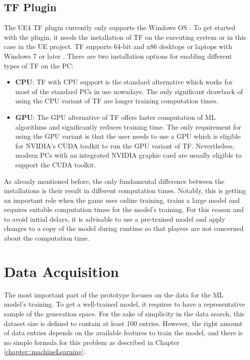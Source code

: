 \documentclass[MGS,Master,english]{twbook}%
\begin{document}
\subsection{\acl{TF} Plugin}
The UE4 \ac{TF} plugin currently only supports the Windows OS \cite{ue4::tensorFlowPlugin}. To get started with the plugin, it needs the installation of \ac{TF} on the executing system or in this case in the UE project. \ac{TF} supports 64-bit and x86 desktops or laptops with Windows 7 or later \cite{api::tensorFlow}. There are two installation options for enabling different types of \ac{TF} on the PC:
\begin{itemize}
	\item \textbf{\ac{CPU}}: \ac{TF} with CPU support is the standard alternative which works for most of the standard PCs in use nowadays. The only significant drawback of using the CPU variant of \ac{TF} are longer training computation times.
	\item \textbf{\ac{GPU}}: The GPU alternative of \ac{TF} offers faster computation of ML algorithms and significantly reduces training time. The only requirement for using the GPU variant is that the user needs to use a GPU which is eligible for NVIDIA's CUDA toolkit \cite{nvidia::cudaToolkit} to run the GPU variant of \ac{TF}. Nevertheless, modern PCs with an integrated NVIDIA graphic card are usually eligible to support the CUDA toolkit. 
\end{itemize}

As already mentioned before, the only fundamental difference between the installations is their result in different computation times. Notably, this is getting an important role when the game uses online training, trains a large model and requires suitable computation times for the model's training. For this reason and to avoid initial delays, it is advisable to use a pre-trained model and apply changes to a copy of the model during runtime so that players are not concerned about the computation time.

\section{Data Acquisition}
The most important part of the prototype focuses on the data for the ML model's training. To get a well-trained model, it requires to have a representative sample of the generation space. For the sake of simplicity in the data search, this dataset size is defined to contain at least 100 entries. However, the right amount of data entries depends on the available features to train the model, and there is no simple formula for this problem as described in Chapter \ref{chapter::machineLearning}. 
\end{document}
